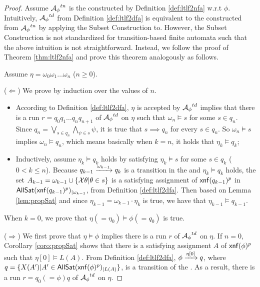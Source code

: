 \begin{proof}
Assume ${\mathcal{A}_{\phi}}^{tn}$ is the \TNFA constructed by Definition \ref{def:ltlf2nfa} w.r.t $\phi$. Intuitively, ${\mathcal{A}_{\phi}}^{td}$ from Definition \ref{def:ltlf2dfa} is equivalent to the \TDFA constructed from ${\mathcal{A}_{\phi}}^{tn}$ by applying the Subset Construction to. However, the Subset Construction is not standardized for transition-based finite automata such that the above intuition is not straightforward. Instead, we follow the proof of Theorem \ref{thm:ltlf2nfa} and prove this theorem analogously as follows.

Assume $\eta = \omega_0\omega_1\ldots\omega_n$ ($n\geq 0$). 

($\Leftarrow$) We prove by induction over the values of $n$.
\begin{itemize}
	\item According to Definition \ref{def:ltlf2dfa}, $\eta$ is accepted by ${\mathcal{A}_{\phi}}^{td}$ implies that there is a run $r=q_0q_1\ldots q_n q_{n+1}$ of ${\mathcal{A}_{\phi}}^{td}$ on $\eta$ such that $\omega_n\models s$ for some $s\in q_n$. Since $q_n = \bigvee_{s\in q_n}\bigwedge_{\psi\in s}\psi$, it is true that $s\implies q_n$ for every $s\in q_n$. So $\omega_n\models s$ implies $\omega_n\models q_n$, which means basically when $k = n$, it holds that $\eta_k\models q_k$;
	\item Inductively, assume $\eta_k\models q_k$ holds by satisfying $\eta_k\models s$ for some $s\in q_k$ ($0<k\leq n$). Because $q_{k-1}\xrightarrow[]{\omega_{k-1}}q_k$ is a transition in the \TDFA and $\eta_k\models q_k$ holds, the set $A_{k-1} = \omega_{k-1}\cup \{\mathcal{X}\theta | \theta\in s\}$ is a satisfying assignment of ${\sf xnf}(q_{k-1})^p$ in ${\sf AllSat}({\sf xnf}(q_{k-1})^p)_{|\omega_{k-1}}$, from Definition \ref{def:ltlf2dfa}. Then based on Lemma \ref{lem:propSat} and since $\eta_{k-1}=\omega_{k-1}\cdot\eta_k$ is true, we have that $\eta_{k-1}\models q_{k-1}$.
\end{itemize}
When $k=0$, we prove that $\eta (=\eta_0)\models \phi (=q_0)$ is true.

($\Rightarrow$) We first prove that $\eta\models\phi$ implies there is a run $r$ of ${\mathcal{A}_{\phi}}^{td}$ on $\eta$. 
If $n = 0$, Corollary \ref{coro:propSat} shows that there is a satisfying assignment $A$ of ${\sf xnf}(\phi)^p$ such that $\eta[0]\models L(A)$. From Definition \ref{def:ltlf2dfa}, $\phi\xrightarrow[]{\eta[0]}q$, where $q=\{X(A') | A'\in{\sf AllSat}({\sf xnf}(\phi)^p)_{|L(A)}\}$, is a transition of the \TDFA. As a result, there is a run $r=q_0(=\phi)q$ of ${\mathcal{A}_{\phi}}^{td}$ on $\eta$.
 

\end{proof}
